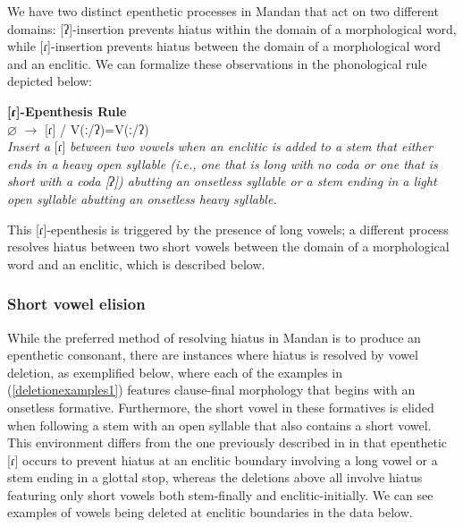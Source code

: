 We have two distinct epenthetic processes in Mandan that act on two different domains: [ʔ]-insertion prevents hiatus within the domain of a morphological word, while [ɾ]-insertion prevents hiatus between the domain of a morphological word and an enclitic. We can formalize these observations in the phonological rule depicted below:

\begin{exe}

\item\label{REpenthesisRule} \textbf{[ɾ]-Epenthesis Rule}\\
	$\varnothing$ $\to$ [ɾ] / V(ː/ʔ)={\longrule}V(ː/ʔ)\\
	\textit{Insert a} [ɾ] \textit{between two vowels when an enclitic is added to a stem that either ends in a heavy open syllable (i.e., one that is long with no coda or one that is short with a coda [ʔ]) abutting an onsetless syllable or a stem ending in a light open syllable abutting an onsetless heavy syllable.}

\end{exe}


This [ɾ]-epenthesis is triggered by the presence of long vowels; a different process resolves hiatus between two short vowels between the domain of a morphological word and an enclitic, which is described below.

\subsubsection{Short vowel elision}\label{shortvoweldeletion}

While the preferred method of resolving hiatus in Mandan is to produce an epenthetic consonant, there are instances where hiatus is resolved by vowel deletion, as exemplified below, where each of the examples in (\ref{deletionexamples1}) features clause-final morphology that begins with an onsetless formative. Furthermore, the short vowel in these formatives is elided when following a stem with an open syllable that also contains a short vowel. This environment differs from the one previously described in  in that epenthetic [ɾ] occurs to prevent hiatus at an enclitic boundary involving a long vowel or a stem ending in a glottal stop, whereas the deletions above all involve hiatus featuring only short vowels both stem-finally and enclitic-initially. We can see examples of vowels being deleted at enclitic boundaries in the data below.


